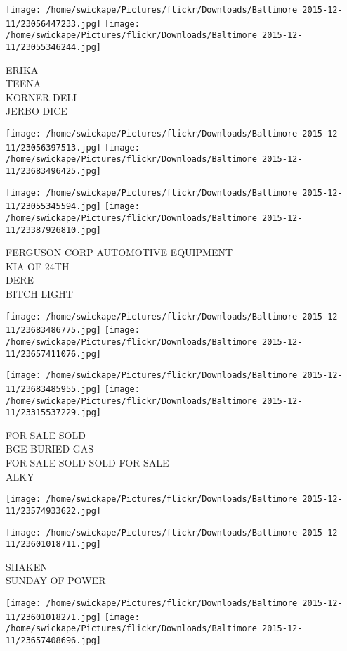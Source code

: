 \documentclass[10pt,letterpaper]{article}
\begin{document}
\texttt{[image: /home/swickape/Pictures/flickr/Downloads/Baltimore 2015-12-11/23056447233.jpg]}
\texttt{[image: /home/swickape/Pictures/flickr/Downloads/Baltimore 2015-12-11/23055346244.jpg]}

ERIKA\\
TEENA\\
KORNER DELI\\
JERBO DICE
\pagebreak

\texttt{[image: /home/swickape/Pictures/flickr/Downloads/Baltimore 2015-12-11/23056397513.jpg]}
\texttt{[image: /home/swickape/Pictures/flickr/Downloads/Baltimore 2015-12-11/23683496425.jpg]}

\texttt{[image: /home/swickape/Pictures/flickr/Downloads/Baltimore 2015-12-11/23055345594.jpg]}
\texttt{[image: /home/swickape/Pictures/flickr/Downloads/Baltimore 2015-12-11/23387926810.jpg]}

FERGUSON CORP AUTOMOTIVE EQUIPMENT\\
KIA OF 24TH\\
DERE\\
BITCH LIGHT
\pagebreak

\texttt{[image: /home/swickape/Pictures/flickr/Downloads/Baltimore 2015-12-11/23683486775.jpg]}
\texttt{[image: /home/swickape/Pictures/flickr/Downloads/Baltimore 2015-12-11/23657411076.jpg]}

\texttt{[image: /home/swickape/Pictures/flickr/Downloads/Baltimore 2015-12-11/23683485955.jpg]}
\texttt{[image: /home/swickape/Pictures/flickr/Downloads/Baltimore 2015-12-11/23315537229.jpg]}

FOR SALE SOLD\\
BGE BURIED GAS\\
FOR SALE SOLD SOLD FOR SALE\\
ALKY
\pagebreak

\texttt{[image: /home/swickape/Pictures/flickr/Downloads/Baltimore 2015-12-11/23574933622.jpg]}

\vspace{0.25in}
\texttt{[image: /home/swickape/Pictures/flickr/Downloads/Baltimore 2015-12-11/23601018711.jpg]}

SHAKEN\\
SUNDAY OF POWER
\pagebreak

\texttt{[image: /home/swickape/Pictures/flickr/Downloads/Baltimore 2015-12-11/23601018271.jpg]}
\texttt{[image: /home/swickape/Pictures/flickr/Downloads/Baltimore 2015-12-11/23657408696.jpg]}
\end{document}
